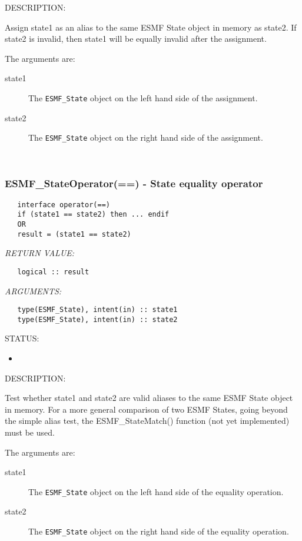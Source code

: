 {\sf DESCRIPTION:\\ }


   Assign state1 as an alias to the same ESMF State object in memory
   as state2. If state2 is invalid, then state1 will be equally invalid after
   the assignment.
  
   The arguments are:
   \begin{description}
   \item[state1]
   The {\tt ESMF\_State} object on the left hand side of the assignment.
   \item[state2]
   The {\tt ESMF\_State} object on the right hand side of the assignment.
   \end{description}
   
 
\mbox{}\hrulefill\ 
 
\subsubsection [ESMF\_StateOperator(==)] {ESMF\_StateOperator(==) - State equality operator}


  
\begin{verbatim}   interface operator(==)
   if (state1 == state2) then ... endif
   OR
   result = (state1 == state2)\end{verbatim}{\em RETURN VALUE:}
\begin{verbatim}   logical :: result\end{verbatim}{\em ARGUMENTS:}
\begin{verbatim}   type(ESMF_State), intent(in) :: state1
   type(ESMF_State), intent(in) :: state2\end{verbatim}
{\sf STATUS:}
   \begin{itemize}
   \item{}
   \end{itemize}
  
{\sf DESCRIPTION:\\ }


   Test whether state1 and state2 are valid aliases to the same ESMF
   State object in memory. For a more general comparison of two ESMF States,
   going beyond the simple alias test, the ESMF\_StateMatch() function (not yet
   implemented) must be used.
  
   The arguments are:
   \begin{description}
   \item[state1]
   The {\tt ESMF\_State} object on the left hand side of the equality
   operation.
   \item[state2]
   The {\tt ESMF\_State} object on the right hand side of the equality
   operation.
   \end{description}
   
